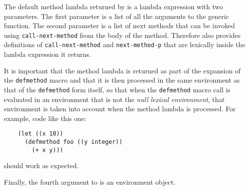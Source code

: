 The default method lambda returned by \mml{} is a
lambda expression with two parameters.  The first parameter is a list
of all the arguments to the generic function.  The second parameter is
a list of next methods that can be invoked using
\texttt{call-next-method} from the body of the method.  Therefore
\mml{} also provides definitions of
\texttt{call-next-method} and \texttt{next-method-p} that are
lexically inside the lambda expression it returns.

It is important that the method lambda is returned as part of the
expansion of the \texttt{defmethod} macro and that it is then
processed in the same environment as that of the \texttt{defmethod}
form itself, so that when the \texttt{defmethod} macro call is
evaluated in an environment that is not the \emph{null lexical
  environment}, that environment is taken into account when the method
lambda is processed.  For example, code like this one:

\begin{verbatim}
    (let ((x 10))
      (defmethod foo ((y integer))
        (+ x y)))
\end{verbatim}

\noindent
should work as expected.

Finally, the fourth argument to \mml{} is an
environment object.
